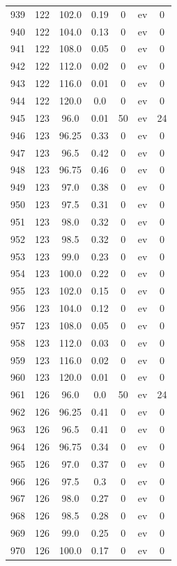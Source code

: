 \documentclass[12pt,a4paper]{article}
\begin{document}
\begin{tabular}{r|cccccc}
	939 & 122 & 102.0 & 0.19 & 0 & ev & 0 \\
	940 & 122 & 104.0 & 0.13 & 0 & ev & 0 \\
	941 & 122 & 108.0 & 0.05 & 0 & ev & 0 \\
	942 & 122 & 112.0 & 0.02 & 0 & ev & 0 \\
	943 & 122 & 116.0 & 0.01 & 0 & ev & 0 \\
	944 & 122 & 120.0 & 0.0 & 0 & ev & 0 \\
	945 & 123 & 96.0 & 0.01 & 50 & ev & 24 \\
	946 & 123 & 96.25 & 0.33 & 0 & ev & 0 \\
	947 & 123 & 96.5 & 0.42 & 0 & ev & 0 \\
	948 & 123 & 96.75 & 0.46 & 0 & ev & 0 \\
	949 & 123 & 97.0 & 0.38 & 0 & ev & 0 \\
	950 & 123 & 97.5 & 0.31 & 0 & ev & 0 \\
	951 & 123 & 98.0 & 0.32 & 0 & ev & 0 \\
	952 & 123 & 98.5 & 0.32 & 0 & ev & 0 \\
	953 & 123 & 99.0 & 0.23 & 0 & ev & 0 \\
	954 & 123 & 100.0 & 0.22 & 0 & ev & 0 \\
	955 & 123 & 102.0 & 0.15 & 0 & ev & 0 \\
	956 & 123 & 104.0 & 0.12 & 0 & ev & 0 \\
	957 & 123 & 108.0 & 0.05 & 0 & ev & 0 \\
	958 & 123 & 112.0 & 0.03 & 0 & ev & 0 \\
	959 & 123 & 116.0 & 0.02 & 0 & ev & 0 \\
	960 & 123 & 120.0 & 0.01 & 0 & ev & 0 \\
	961 & 126 & 96.0 & 0.0 & 50 & ev & 24 \\
	962 & 126 & 96.25 & 0.41 & 0 & ev & 0 \\
	963 & 126 & 96.5 & 0.41 & 0 & ev & 0 \\
	964 & 126 & 96.75 & 0.34 & 0 & ev & 0 \\
	965 & 126 & 97.0 & 0.37 & 0 & ev & 0 \\
	966 & 126 & 97.5 & 0.3 & 0 & ev & 0 \\
	967 & 126 & 98.0 & 0.27 & 0 & ev & 0 \\
	968 & 126 & 98.5 & 0.28 & 0 & ev & 0 \\
	969 & 126 & 99.0 & 0.25 & 0 & ev & 0 \\
	970 & 126 & 100.0 & 0.17 & 0 & ev & 0 \\

\end{tabular}
\end{document}
